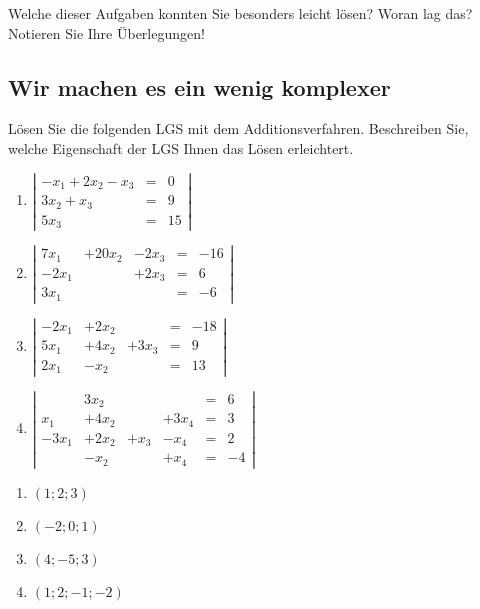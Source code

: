 \documentclass[12pt,a4paper,twoside,fleqn]{article}
\begin{document}
Welche dieser Aufgaben konnten Sie besonders leicht lösen? Woran lag
das? Notieren Sie Ihre Überlegungen!
\subsection{Wir machen es ein wenig komplexer}
\begin{question}%
  Lösen Sie die folgenden LGS mit dem Additionsverfahren. Beschreiben
  Sie, welche Eigenschaft der LGS Ihnen das Lösen erleichtert.
  \begin{multicols}{2}
    \begin{enumerate}
    \item  
      $\left|\begin{array}{rcl}
         -x_1+2x_2-x_3&=& 0\\
         3x_2+x_3&=& 9\\
         5x_3&=&15
       \end{array}\right|$
      \item   
        $\left|\begin{array}{rrrcl}
           7x_1&+20x_2&-2x_3&=& -16\\
           -2x_1&& +2x_3&=& 6\\
           3x_1&&&=&-6
         \end{array}\right|$ 
     \item 
        $\left|\begin{array}{rllcl}
           -2x_1&+2x_2&&=& -18\\
           5x_1&+4x_2& +3x_3&=&9 \\
           2x_1&-x_2&&=&13
         \end{array}\right|$ 
     \item 
       $\left|\begin{array}{rlllcl}
                &3x_2&&&=&6    \\
                x_1&+4x_2&&+3x_4&=&3 \\
                -3x_1&+2x_2&+x_3&-x_4&=& 2\\
                &-x_2&&+x_4&=&-4
              \end{array}\right|$ 
    \end{enumerate}
  \end{multicols}
\end{question}
\begin{solution}
  \begin{multicols}{4}
    \begin{enumerate}
    \item $(1;2;3)$
    \item $(-2;0;1)$
    \item $(4;-5;3)$
    \item $(1;2;-1;-2)$
    \end{enumerate}
  \end{multicols}
\end{solution}
\end{document}
